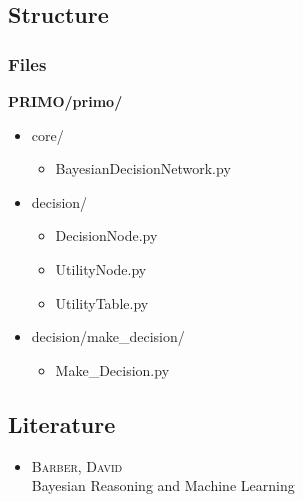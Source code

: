 \subsection{Structure}
\begin{frame}
\frametitle{Files}
\Large\textbf{PRIMO/primo/}
\begin{itemize}
	\item core/
	\begin{itemize}
		\item BayesianDecisionNetwork.py
	\end{itemize}
	\item decision/
	\begin{itemize}
		\item DecisionNode.py
		\item UtilityNode.py
		\item UtilityTable.py
	\end{itemize}
	\item decision/make\_decision/
	\begin{itemize}
		\item Make\_Decision.py
	\end{itemize}
\end{itemize}
\end{frame}


\subsection{Literature}
\begin{frame}
\begin{itemize}
\item \textsc{Barber, David} \\ Bayesian Reasoning and Machine Learning
\end{itemize}
\end{frame}